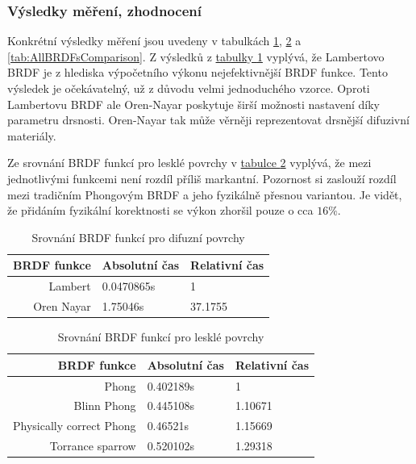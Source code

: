 \documentclass[czech,master]{diploma}
\begin{document}
\subsubsection{Výsledky měření, zhodnocení}
Konkrétní výsledky měření jsou uvedeny v tabulkách \hyperref[tab:DiffuseBRDFsComparison]{\ref{tab:DiffuseBRDFsComparison}}, \hyperref[tab:GlossyBRDFsComparison]{\ref{tab:GlossyBRDFsComparison}} a \hyperref[tab:AllBRDFsComparison]{\ref{tab:AllBRDFsComparison}}.  Z výsledků z \hyperref[tab:DiffuseBRDFsComparison]{tabulky \ref{tab:DiffuseBRDFsComparison}} vyplývá, že Lambertovo BRDF je z hlediska výpočetního výkonu nejefektivnější BRDF funkce. Tento výsledek je očekávatelný, už z důvodu velmi jednoduchého vzorce. Oproti Lambertovu BRDF ale Oren-Nayar poskytuje širší možnosti nastavení díky parametru drsnosti. Oren-Nayar tak může věrněji reprezentovat drsnější difuzivní materiály.\par
Ze srovnání BRDF funkcí pro lesklé povrchy v \hyperref[tab:GlossyBRDFsComparison]{tabulce \ref{tab:GlossyBRDFsComparison}} vyplývá, že mezi jednotlivými funkcemi není rozdíl příliš markantní. Pozornost si zaslouží rozdíl mezi tradičním Phongovým BRDF a jeho fyzikálně přesnou variantou. Je vidět, že přidáním fyzikální korektnosti se výkon zhoršil pouze o cca \(16\%\).


\begin{table}[ht]
  \centering
  \begin{tabular}{r|ll}
    BRDF funkce & Absolutní čas & Relativní čas \\
    \hline
    Lambert     & 0.0470865s    & 1             \\
    Oren Nayar  & 1.75046s      & 37.1755
  \end{tabular}
  \caption{Srovnání BRDF funkcí pro difuzní povrchy}
  \label{tab:DiffuseBRDFsComparison}
\end{table}

\begin{table}[ht]
  \centering
  \begin{tabular}{r|ll}
    BRDF funkce              & Absolutní čas & Relativní čas \\
    \hline
    Phong                    & 0.402189s     & 1             \\
    Blinn Phong              & 0.445108s     & 1.10671       \\
    Physically correct Phong & 0.46521s      & 1.15669       \\
    Torrance sparrow         & 0.520102s     & 1.29318
  \end{tabular}
  \caption{Srovnání BRDF funkcí pro lesklé povrchy}
  \label{tab:GlossyBRDFsComparison}
\end{table}
\end{document}
